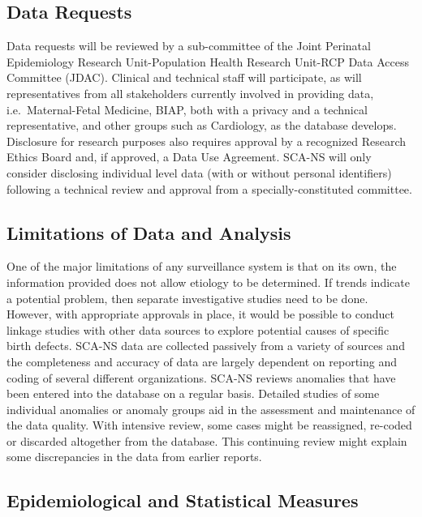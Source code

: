 \documentclass[
]{krantz}
\begin{document}
\hypertarget{data-requests}{%
\subsection*{Data Requests}\label{data-requests}}


Data requests will be reviewed by a sub-committee of the Joint Perinatal Epidemiology Research Unit-Population Health Research Unit-RCP Data Access Committee (JDAC). Clinical and technical staff will participate, as will representatives from all stakeholders currently involved in providing data, i.e.~Maternal-Fetal Medicine, BIAP, both with a privacy and a technical representative, and other groups such as Cardiology, as the database develops. Disclosure for research purposes also requires approval by a recognized Research Ethics Board and, if approved, a Data Use Agreement. SCA-NS will only consider disclosing individual level data (with or without personal identifiers) following a technical review and approval from a specially-constituted committee.

\hypertarget{limitations-of-data-and-analysis}{%
\subsection*{Limitations of Data and Analysis}\label{limitations-of-data-and-analysis}}


One of the major limitations of any surveillance system is that on its own, the information provided does not allow etiology to be determined. If trends indicate a potential problem, then separate investigative studies need to be done. However, with appropriate approvals in place, it would be possible to conduct linkage studies with other data sources to explore potential causes of specific birth defects. SCA-NS data are collected passively from a variety of sources and the completeness and accuracy of data are largely dependent on reporting and coding of several different organizations. SCA-NS reviews anomalies that have been entered into the database on a regular basis. Detailed studies of some individual anomalies or anomaly groups aid in the assessment and maintenance of the data quality. With intensive review, some cases might be reassigned, re-coded or discarded altogether from the database. This continuing review might explain some discrepancies in the data from earlier reports.

\hypertarget{epidemiological-and-statistical-measures}{%
\subsection*{Epidemiological and Statistical Measures}\label{epidemiological-and-statistical-measures}}
\end{document}
